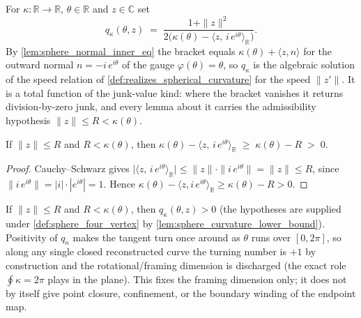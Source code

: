 \begin{definition}
  \label{def:spherical_speed}
  For $\kappa:\mathbb R\to\mathbb R$, $\theta\in\mathbb R$ and $z\in\mathbb C$ set
  \[
    q_\kappa(\theta,z)\;=\;\frac{1+\|z\|^2}
      {2\bigl(\kappa(\theta)-\langle z,\,i\,e^{i\theta}\rangle_{\mathbb R}\bigr)} .
  \]
  By \cref{lem:sphere_normal_inner_eq} the bracket equals
  $\kappa(\theta)+\langle z,n\rangle$ for the outward normal $n=-i\,e^{i\theta}$ of the
  gauge $\varphi(\theta)=\theta$, so $q_\kappa$ is the algebraic solution of the speed
  relation of \cref{def:realizes_spherical_curvature} for the speed $\|z'\|$. It is a total
  function of the junk-value kind: where the bracket vanishes it returns
  division-by-zero junk, and every lemma about it carries the admissibility hypothesis
  $\|z\|\le R<\kappa(\theta)$.
\end{definition}

\begin{lemma}
  \label{lem:sphere_denom_pos}
  If $\|z\|\le R$ and $R<\kappa(\theta)$, then
  $\kappa(\theta)-\langle z,\,i\,e^{i\theta}\rangle_{\mathbb R}\;\ge\;\kappa(\theta)-R\;>\;0$.
\end{lemma}

\begin{proof}

\leanok
  Cauchy--Schwarz gives
  $\bigl|\langle z,\,i\,e^{i\theta}\rangle_{\mathbb R}\bigr|\le\|z\|\cdot\|i\,e^{i\theta}\|
  =\|z\|\le R$, since $\|i\,e^{i\theta}\|=|i|\cdot|e^{i\theta}|=1$. Hence
  $\kappa(\theta)-\langle z, i\,e^{i\theta}\rangle_{\mathbb R}\ge\kappa(\theta)-R>0$.
\end{proof}

\begin{lemma}
  \label{lem:spherical_speed_solve}
  If $\|z\|\le R$ and $R<\kappa(\theta)$, then $q_\kappa(\theta,z)>0$ (the hypotheses are
  supplied under \cref{def:sphere_four_vertex} by \cref{lem:sphere_curvature_lower_bound}).
  Positivity of $q_\kappa$ makes the tangent turn once around as $\theta$ runs over
  $[0,2\pi]$, so along any single closed reconstructed curve the turning number is $+1$ by
  construction and the rotational/framing dimension is discharged (the exact role
  $\oint\kappa=2\pi$ plays in the plane). This fixes the framing dimension only; it does not
  by itself give point closure, confinement, or the boundary winding of the endpoint map.
\end{lemma}

